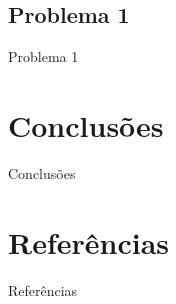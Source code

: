 \documentclass[professionalfont]{beamer}
\begin{document}
\subsection{Problema 1}
\begin{frame}{Problema 1}
    
\end{frame}

\section{Conclusões}
\begin{frame}{Conclusões}
    
\end{frame}


\section{Referências}

\begin{frame}[allowframebreaks]{Referências}
    \scriptsize
    
\end{frame}
\end{document}
